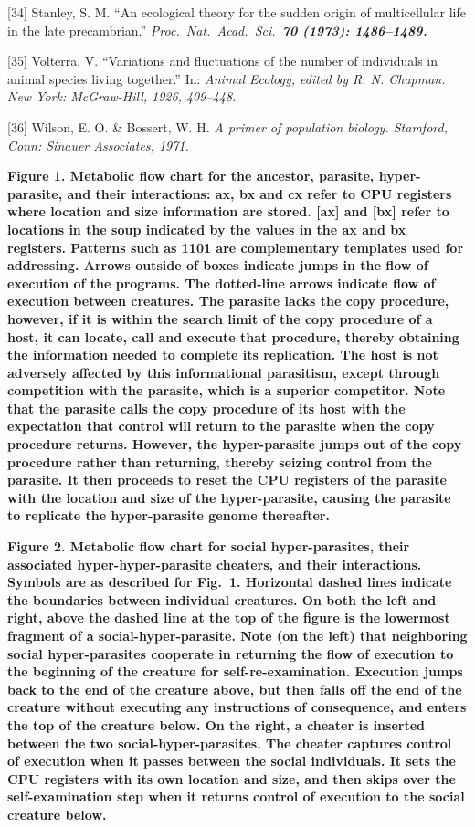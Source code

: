[34] Stanley, S. M.  ``An ecological theory for the sudden origin
of multicellular life in the late precambrian.''  \it Proc.\ Nat.\ Acad.\
Sci.\ \bf 70 \rm (1973): 1486--1489.

[35] Volterra, V.  ``Variations and fluctuations of the number of individuals
in animal species living together.''  In: \it Animal Ecology\rm , edited by
R. N. Chapman.  New York: McGraw-Hill, 1926, 409--448.

[36] Wilson, E. O. \& Bossert, W. H.  \it A primer of population
biology\rm .  Stamford, Conn: Sinauer Associates, 1971.
\eXP

\newpage

\LP
\bf Figure 1.  Metabolic flow chart for the ancestor, parasite, hyper-parasite,
and their interactions: \rm ax, bx and cx refer to CPU registers where location
and size information are stored.  [ax] and [bx] refer to locations in the
soup indicated by the values in the ax and bx registers.  Patterns such as
1101 are complementary templates used for addressing.  Arrows outside of boxes
indicate jumps in the flow of execution of the programs.  The dotted-line
arrows indicate flow of execution between creatures.  The parasite lacks the
copy procedure, however, if it is within the search limit of the copy
procedure of a host, it can locate, call and execute that procedure, thereby
obtaining the information needed to complete its replication.  The host is
not adversely affected by this informational parasitism, except through
competition with the parasite, which is a superior competitor.  Note that
the parasite calls the copy procedure of its host with the expectation that
control will return to the parasite when the copy procedure returns.  However,
the hyper-parasite jumps out of the copy procedure rather than returning,
thereby seizing control from the parasite.  It then proceeds to reset the CPU
registers of the parasite with the location and size of the hyper-parasite,
causing the parasite to replicate the hyper-parasite genome thereafter.

\newpage
\addtocounter{page}{1}

\bf Figure 2.  Metabolic flow chart for social hyper-parasites, their
associated hyper-hyper-parasite cheaters, and their interactions. \rm  Symbols
are as described for Fig.\ 1.  Horizontal dashed lines indicate the boundaries
between individual creatures.  On both the left and right, above the dashed
line at the top of the figure is the lowermost fragment of a
social-hyper-parasite.  Note (on the left) that neighboring social
hyper-parasites cooperate in returning the flow of execution to the beginning
of the creature for self-re-examination.  Execution jumps back to the end of
the creature above, but then falls off the end of the creature without
executing any instructions of consequence, and enters the top of the creature
below.  On the right, a cheater is inserted between the two
social-hyper-parasites.  The cheater captures control of execution when it
passes between the social individuals.  It sets the CPU registers with its own
location and size, and then skips over the self-examination step when it
returns control of execution to the social creature below.


